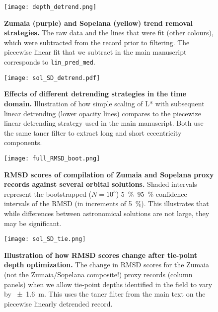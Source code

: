 \documentclass[draft]{agujournal2019}
\begin{document}
\begin{figure}[htbp]
  \centering
  \texttt{[image: depth\_detrend.png]}
  \caption{\label{fig:detrend}
    \textbf{Zumaia (purple) and Sopelana (yellow) trend removal strategies.}
    The raw data and the lines that were fit (other colours), which were subtracted from the record prior to filtering.
    The piecewise linear fit that we subtract in the main manuscript corresponds to \texttt{lin\_pred\_med}.
  }
\end{figure}

\begin{figure}[htb]
  \centering \texttt{[image: sol\_SD\_detrend.pdf]}
  \caption{\label{fig:Lstar-detrend}
  \textbf{Effects of different detrending strategies in the time domain.}
    Illustration of how simple scaling of \gls{L*} with subsequent linear detrending (lower opacity lines)
    compares to the piecewize linear detrending strategy used in the main manuscript.
    Both use the same taner filter to extract long and short eccentricity components.
    }
\end{figure}

\begin{figure}[htb]
    \centering
    \texttt{[image: full\_RMSD\_boot.png]}
    \caption{\label{fig:full-RMSD-boot}
        \textbf{\gls{RMSD} scores of compilation of Zumaia and Sopelana proxy records against several orbital solutions.}
        Shaded intervals represent the bootstrapped (\(N = 10^{5}\)) \qtyrange{5}{95}{\percent} confidence intervals of the \gls{RMSD} (in increments of \qty{5}{\percent}).
        This illustrates that while differences between astronomical solutions are not large, they may be significant.
    }
\end{figure}

\begin{figure}[htb]
  \centering \texttt{[image: sol\_SD\_tie.png]}
  \caption{\label{fig:full-RMSD-tie}
    \textbf{Illustration of how RMSD scores change after tie-point depth optimization.}
    The change in \gls{RMSD} scores for the
    Zumaia (not the Zumaia/Sopelana composite!) proxy records (column panels)
    when we allow tie-point depths identified in the field to vary by \qty{\pm1.6}{\metre}.
    This uses the taner filter from the main text on the piecewise linearly detrended record.
    }
\end{figure}
\end{document}
